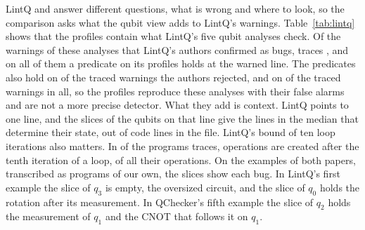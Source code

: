 LintQ and \tool{} answer different questions, what is wrong and where to look, so the comparison asks what the qubit
view adds to LintQ's warnings. Table~\ref{tab:lintq} shows that the profiles contain what LintQ's five qubit analyses
check. Of the \numLqQubitTp{} warnings of these analyses that LintQ's authors confirmed as bugs, \tool{} traces
\numLqQubitTraced{}, and on all of them a predicate on its profiles holds at the warned line. The predicates also hold on
\numLqFpFires{} of the \numLqFpTraced{} traced warnings the authors rejected, and on \numLqSarifFires{} of the
\numLqSarifTraced{} traced warnings in all, so the profiles reproduce these analyses with their false alarms and are not
a more precise detector. What they add is context. LintQ points to one line, and the slices of the qubits on that line
give the \numLqReadMedian{} lines in the median that determine their state, out of \numLqCodeMedian{} code lines in the
file. LintQ's bound of ten loop iterations also matters. In \numLqBeyondTenFiles{} of the programs \tool{} traces,
operations are created after the tenth iteration of a loop, \numLqBeyondTenOpsPct{} of all their operations. On the
examples of both papers, transcribed as programs of our own, the slices show each bug. In LintQ's first example the
slice of $q_3$ is empty, the oversized circuit, and the slice of $q_0$ holds the rotation after its measurement. In
QChecker's fifth example the slice of $q_2$ holds the measurement of $q_1$ and the CNOT that follows it on $q_1$.

